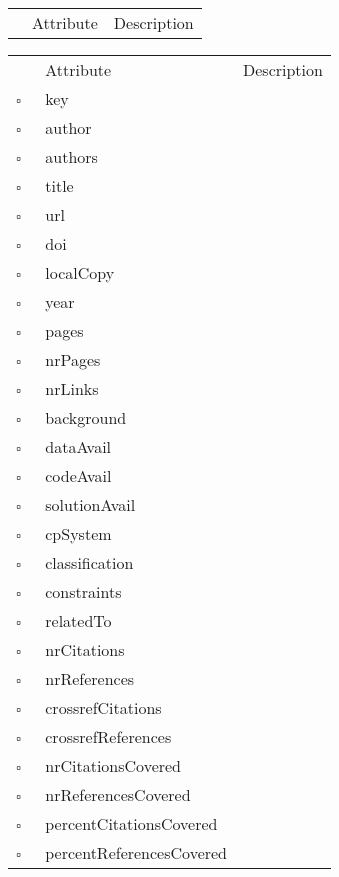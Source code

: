 \begin{table}
\caption{UncategorizedReference  }

\begin{longtable}{llp{8cm}}
& Attribute & Description \\
\end{longtable}
\label{attr:UncategorizedReference}
\end{table}

\begin{table}
\caption{Work  }

\begin{longtable}{llp{8cm}}
& Attribute & Description \\
$\square$\ & key &  \\
$\square$\ & author &  \\
$\square$\ & authors &  \\
$\square$\ & title &  \\
$\square$\ & url &  \\
$\square$\ & doi &  \\
$\square$\ & localCopy &  \\
$\square$\ & year &  \\
$\square$\ & pages &  \\
$\square$\ & nrPages &  \\
$\square$\ & nrLinks &  \\
$\square$\ & background &  \\
$\square$\ & dataAvail &  \\
$\square$\ & codeAvail &  \\
$\square$\ & solutionAvail &  \\
$\square$\ & cpSystem &  \\
$\square$\ & classification &  \\
$\square$\ & constraints &  \\
$\square$\ & relatedTo &  \\
$\square$\ & nrCitations &  \\
$\square$\ & nrReferences &  \\
$\square$\ & crossrefCitations &  \\
$\square$\ & crossrefReferences &  \\
$\square$\ & nrCitationsCovered &  \\
$\square$\ & nrReferencesCovered &  \\
$\square$\ & percentCitationsCovered &  \\
$\square$\ & percentReferencesCovered &  \\
\end{longtable}
\label{attr:Work}
\end{table}
